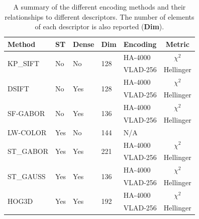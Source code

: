 \begin{table}
\caption{A summary of the different encoding methods and their relationships to different descriptors. The number of elements of each descriptor is also reported (\textbf{Dim}).}
\label{tbl:Methods}
\small
\centering
    \begin{tabular}{l p{0.5cm} p{0.9cm} p{0.5cm} p{2.5cm} c }
    \hline
    \textbf{Method}              & \textbf{ST} & \textbf{Dense} & \textbf{Dim}  & \textbf{Encoding}      & \textbf{Metric}    \\ \hline
    \multirow{2}{*}{KP\_SIFT} & \multirow{2}{*}{No} & \multirow{2}{*}{No} & \multirow{2}{*}{128}     & HA-4000  &   $\chi^2$    \\ \cline{5-6} 
        ~                   & ~      & ~           & ~      & VLAD-256 & Hellinger \\ \hline
    \multirow{2}{*}{DSIFT} & \multirow{2}{*}{No} & \multirow{2}{*}{Yes} & \multirow{2}{*}{128}     & HA-4000  &   $\chi^2$    \\ \cline{5-6}
    ~                   & ~      & ~           & ~      & VLAD-256 & Hellinger \\ \hline
    \multirow{2}{*}{SF-GABOR} & \multirow{2}{*}{No}               & \multirow{2}{*}{Yes}  & \multirow{2}{*}{136}  & HA-4000  & $\chi^2$      \\  \cline{5-6}
    ~                   & ~      & ~           & ~      & VLAD-256 & Hellinger \\ \hline
    LW-COLOR           & Yes & No & 144           & N/A       \\ \hline
    \multirow{2}{*}{ST\_GABOR}          & \multirow{2}{*}{Yes}              & \multirow{2}{*}{Yes}  & \multirow{2}{*}{221}  & HA-4000  & $\chi^2$      \\  \cline{5-6}
    ~                   & ~      & ~           & ~      & VLAD-256 & Hellinger \\ \hline
    \multirow{2}{*}{ST\_GAUSS}           & \multirow{2}{*}{Yes}              & \multirow{2}{*}{Yes}  & \multirow{2}{*}{136}  & HA-4000  & $\chi^2$      \\  \cline{5-6}
    ~                   & ~      & ~           & ~      & VLAD-256 & Hellinger \\ \hline
    \multirow{2}{*}{HOG3D}               & \multirow{2}{*}{Yes}              & \multirow{2}{*}{Yes} & \multirow{2}{*}{192}   &  HA-4000  & $\chi^2$      \\  \cline{5-6}
    ~                   & ~       & ~          & ~      & VLAD-256 & Hellinger \\ \hline
    \end{tabular}
    \normalsize
\end{table}


